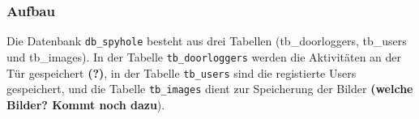 \subsubsection{Aufbau}
				
Die Datenbank \texttt{db\_spyhole} besteht aus drei Tabellen (tb\_doorloggers, tb\_users und tb\_images). In der  Tabelle \texttt{tb\_doorloggers} werden die Aktivitäten an der Tür gespeichert \textbf{(?)}, in der Tabelle \texttt{tb\_users} sind die registierte Users gespeichert, und die Tabelle \texttt{tb\_images} dient zur Speicherung der Bilder \textbf{(welche Bilder? Kommt noch dazu}).  

